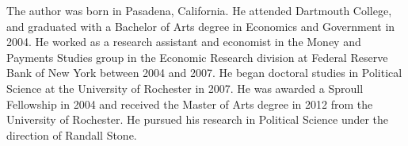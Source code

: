 The author was born in Pasadena, California. 
He attended Dartmouth College, and graduated with a Bachelor of Arts degree in Economics and Government in 2004.
He worked as a research assistant and economist in the Money and Payments Studies group in the Economic Research division at Federal Reserve Bank of New York between 2004 and 2007.
He began doctoral studies in Political Science at the University of Rochester in 2007.
He was awarded a Sproull Fellowship in 2004 and received the Master of Arts degree in 2012 from the University of Rochester.
He pursued his research in Political Science under the direction of Randall Stone.

\bigskip\noindent%

